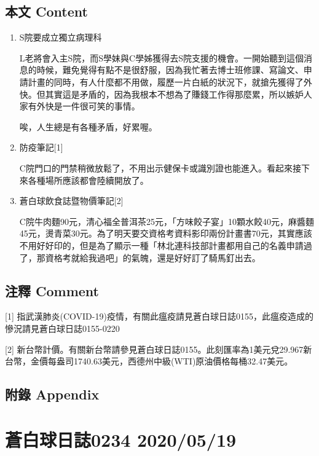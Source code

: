 \documentclass[a5paper, 12pt
]{book}
\begin{document}
\hypertarget{ux672cux6587-content-78}{%
\subsection{本文 Content}\label{ux672cux6587-content-78}}

\begin{enumerate}
\def\labelenumi{\arabic{enumi}.}
\item
  S院要成立獨立病理科

  L老將會入主S院，而S學妹與C學姊獲得去S院支援的機會。一開始聽到這個消息的時候，難免覺得有點不是很舒服，因為我忙著去博士班修課、寫論文、申請計畫的同時，有人什麼都不用做，履歷一片白紙的狀況下，就搶先獲得了外快。但其實這是矛盾的，因為我根本不想為了賺錢工作得那麼累，所以嫉妒人家有外快是一件很可笑的事情。

  唉，人生總是有各種矛盾，好累喔。
\item
  防疫筆記{[}1{]}

  C院門口的門禁稍微放鬆了，不用出示健保卡或識別證也能進入。看起來接下來各種場所應該都會陸續開放了。
\item
  蒼白球飲食誌暨物價筆記{[}2{]}

  C院牛肉麵90元，清心福全普洱茶25元，「方味餃子宴」10顆水餃40元，麻醬麵45元，燙青菜30元。為了明天要交資格考資料影印兩份計畫書70元，其實應該不用好好印的，但是為了顯示一種「林北連科技部計畫都用自己的名義申請過了，那資格考就給我過吧」的氣魄，還是好好訂了騎馬釘出去。
\end{enumerate}

\hypertarget{ux6ce8ux91cb-comment-78}{%
\subsection{注釋 Comment}\label{ux6ce8ux91cb-comment-78}}

{[}1{]}
指武漢肺炎(COVID-19)疫情，有關此瘟疫請見蒼白球日誌0155，此瘟疫造成的慘況請見蒼白球日誌0155-0220

{[}2{]}
新台幣計價。有關新台幣請參見蒼白球日誌0155。此刻匯率為1美元兌29.967新台幣，金價每盎司1740.63美元，西德州中級(WTI)原油價格每桶32.47美元。

\hypertarget{ux9644ux9304-appendix-78}{%
\subsection{附錄 Appendix}\label{ux9644ux9304-appendix-78}}

\hypertarget{ux84bcux767dux7403ux65e5ux8a8c0234-20200519}{%
\section{蒼白球日誌0234
2020/05/19}\label{ux84bcux767dux7403ux65e5ux8a8c0234-20200519}}
\end{document}
